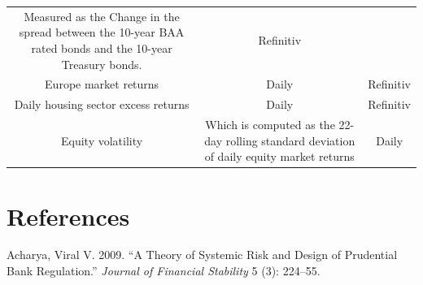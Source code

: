 \documentclass[
  10pt,
]{article}
\begin{document}
\begin{longtable}[]{@{}ccc@{}}
\begin{minipage}[t]{0.32\columnwidth}
Measured as the Change in the spread between the 10-year BAA rated bonds
and the 10-year Treasury bonds.\strut
\end{minipage} & \begin{minipage}[t]{0.24\columnwidth}\centering
Refinitiv\strut
\end{minipage}\tabularnewline
\begin{minipage}[t]{0.36\columnwidth}\centering
Europe market returns\strut
\end{minipage} & \begin{minipage}[t]{0.32\columnwidth}\centering
Daily\strut
\end{minipage} & \begin{minipage}[t]{0.24\columnwidth}\centering
Refinitiv\strut
\end{minipage}\tabularnewline
\begin{minipage}[t]{0.36\columnwidth}\centering
Daily housing sector excess returns\strut
\end{minipage} & \begin{minipage}[t]{0.32\columnwidth}\centering
Daily\strut
\end{minipage} & \begin{minipage}[t]{0.24\columnwidth}\centering
Refinitiv\strut
\end{minipage}\tabularnewline
\begin{minipage}[t]{0.36\columnwidth}\centering
Equity volatility\strut
\end{minipage} & \begin{minipage}[t]{0.32\columnwidth}\centering
Which is computed as the 22-day rolling standard deviation of daily
equity market returns\strut
\end{minipage} & \begin{minipage}[t]{0.24\columnwidth}\centering
Daily\strut
\end{minipage}\tabularnewline
\bottomrule
\end{longtable}

\hypertarget{references}{%
\section{References}\label{references}}

\setlength{\parindent}{-0.2in}
\setlength{\leftskip}{0.2in}
\setlength{\parskip}{8pt}
\vspace*{-0.2in}

\noindent

\hypertarget{refs}{}
\leavevmode\hypertarget{ref-Acharya2009}{}%
Acharya, Viral V. 2009. ``A Theory of Systemic Risk and Design of
Prudential Bank Regulation.'' \emph{Journal of Financial Stability} 5
(3): 224--55.
\end{document}
